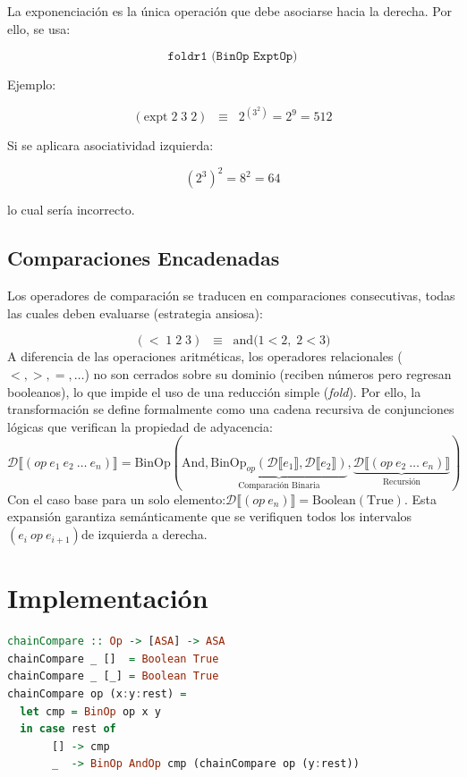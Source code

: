 \documentclass[a4paper,12pt]{article}
\begin{document}
\begin{tcolorbox}[title= Corrección: Desugar modulo A4, breakable]
La exponenciación es la única operación que debe asociarse hacia la derecha. Por ello, se usa:

\[
\texttt{foldr1 (BinOp ExptOp)}
\]

Ejemplo:

\[
(\text{expt}\; 2\; 3\; 2)
\;\;\equiv\;\;
2^{(3^{2})}
=
2^{9}
= 512
\]

Si se aplicara asociatividad izquierda:

\[
(2^3)^2 = 8^2 = 64
\]

lo cual sería incorrecto.

\subsection{Comparaciones Encadenadas}

Los operadores de comparación se traducen en comparaciones consecutivas, todas las cuales deben evaluarse (estrategia ansiosa):

\[
(<\; 1\; 2\; 3)
\;\;\equiv\;\;
\text{and}\bigl(1 < 2,\; 2 < 3\bigr)
\]
A diferencia de las operaciones aritméticas, los operadores relacionales ($<, >, =, \dots$) no son cerrados sobre su dominio (reciben números pero regresan booleanos), lo que impide el uso de una reducción simple (\textit{fold}). Por ello, la transformación se define formalmente como una cadena recursiva de conjunciones lógicas que verifican la propiedad de adyacencia:$$\mathcal{D}\llbracket (op \ e_1 \ e_2 \ \dots \ e_n) \rrbracket = 
\text{BinOp}(\text{And}, 
\underbrace{\text{BinOp}_{op}(\mathcal{D}\llbracket e_1 \rrbracket, \mathcal{D}\llbracket e_2 \rrbracket)}_{\text{Comparación Binaria}}, 
\underbrace{\mathcal{D}\llbracket (op \ e_2 \ \dots \ e_n) \rrbracket}_{\text{Recursión}})$$Con el caso base para un solo elemento:$\mathcal{D}\llbracket (op \ e_n) \rrbracket = \text{Boolean}(\text{True})$. Esta expansión garantiza semánticamente que se verifiquen todos los intervalos$(e_i \ op \ e_{i+1})$de izquierda a derecha.

\section{Implementación}

\begin{lstlisting}[language=Haskell]
chainCompare :: Op -> [ASA] -> ASA
chainCompare _ []  = Boolean True
chainCompare _ [_] = Boolean True
chainCompare op (x:y:rest) =
  let cmp = BinOp op x y
  in case rest of
       [] -> cmp
       _  -> BinOp AndOp cmp (chainCompare op (y:rest))
\end{lstlisting}


\end{tcolorbox}
\end{document}
